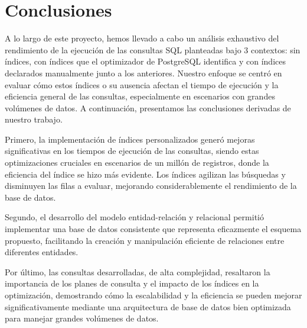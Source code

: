 \section{Conclusiones}
A lo largo de este proyecto, hemos llevado a cabo un análisis exhaustivo del rendimiento de la ejecución de las consultas SQL planteadas bajo 3 contextos: sin índices, con índices que el optimizador de PostgreSQL identifica y con índices declarados manualmente junto a los anteriores. Nuestro enfoque se centró en evaluar cómo estos índices o su ausencia afectan el tiempo de ejecución y la eficiencia general de las consultas, especialmente en escenarios con grandes volúmenes de datos. A continuación, presentamos las conclusiones derivadas de nuestro trabajo.

Primero, la implementación de índices personalizados generó mejoras significativas en los tiempos de ejecución de las consultas, siendo estas optimizaciones cruciales en escenarios de un millón de registros, donde la eficiencia del índice se hizo más evidente. Los índices agilizan las búsquedas y disminuyen las filas a evaluar, mejorando considerablemente el rendimiento de la base de datos.

Segundo, el desarrollo del modelo entidad-relación y relacional permitió implementar una base de datos consistente que representa eficazmente el esquema propuesto, facilitando la creación y manipulación eficiente de relaciones entre diferentes entidades.

Por último, las consultas desarrolladas, de alta complejidad, resaltaron la importancia de los planes de consulta y el impacto de los índices en la optimización, demostrando cómo la escalabilidad y la eficiencia se pueden mejorar significativamente mediante una arquitectura de base de datos bien optimizada para manejar grandes volúmenes de datos.